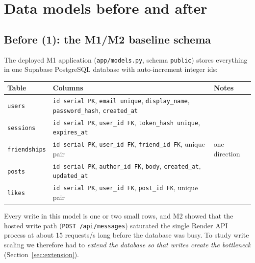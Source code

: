 \section{Data models before and after}\label{sec:models}

\subsection{Before (1): the M1/M2 baseline schema}
The deployed M1 application (\texttt{app/models.py}, schema \texttt{public}) stores everything in one
Supabase PostgreSQL database with auto-increment integer ids:

\begin{center}\small
\begin{tabular}{@{}lll@{}}
\toprule
Table & Columns & Notes \\
\midrule
\texttt{users} & \texttt{id serial PK}, \texttt{email unique}, \texttt{display\_name}, \texttt{password\_hash}, \texttt{created\_at} & \\
\texttt{sessions} & \texttt{id serial PK}, \texttt{user\_id FK}, \texttt{token\_hash unique}, \texttt{expires\_at} & \\
\texttt{friendships} & \texttt{id serial PK}, \texttt{user\_id FK}, \texttt{friend\_id FK}, unique pair & one direction \\
\texttt{posts} & \texttt{id serial PK}, \texttt{author\_id FK}, \texttt{body}, \texttt{created\_at}, \texttt{updated\_at} & \\
\texttt{likes} & \texttt{id serial PK}, \texttt{user\_id FK}, \texttt{post\_id FK}, unique pair & \\
\bottomrule
\end{tabular}
\end{center}
Every write in this model is one or two small rows, and M2 showed that the hosted write path
(\texttt{POST /api/messages}) saturated the single Render API process at about 15 requests/s long
before the database was busy. To study write scaling we therefore had to \emph{extend the database so
that writes create the bottleneck} (Section~\ref{sec:extension}).

